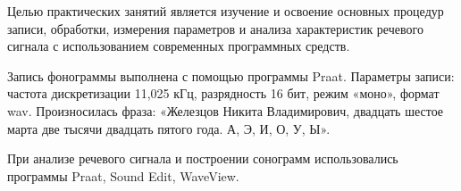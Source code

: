 
Целью практических занятий является изучение и освоение основных процедур
записи, обработки, измерения параметров и анализа характеристик речевого
сигнала с использованием современных программных средств.

Запись фонограммы выполнена с помощью программы Praat. Параметры записи:
частота дискретизации 11,025 кГц, разрядность 16 бит, режим «моно», формат wav.
Произносилась фраза: «Железцов Никита Владимирович, двадцать шестое марта две
тысячи двадцать пятого года. А, Э, И, О, У, Ы».

При анализе речевого сигнала и построении сонограмм использовались
программы Praat, Sound Edit, WaveView.
